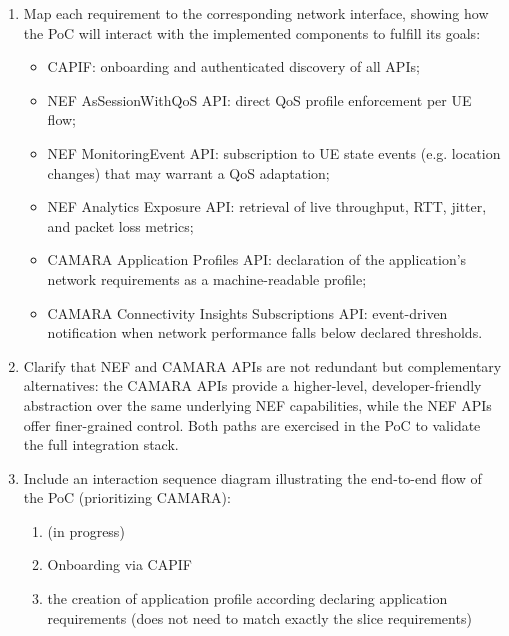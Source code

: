 {\begin{enumerate}
\begin{itemize}
            \item Dynamic \acs{QoS} adaptation enforced through CAMARA \acs{QoS} \acs{API} in response to either geographical changes obtained with CAMARA Device Location \acs{API} in digital twin / \acs{CAM} scenarios, or to network quality deterioration (or to video quality deterioration in case of video streaming/broadcast).
            \item \acs{PPDR}: \acs{IOPS}, \acs{FIDEGAD}
        \end{itemize}
        \item Map each requirement to the corresponding network interface, showing how the PoC will interact with the implemented components to fulfill its goals:
        \begin{itemize}
            \item CAPIF: onboarding and authenticated discovery of all APIs;
            \item NEF AsSessionWithQoS API: direct QoS profile enforcement per UE flow;
            \item NEF MonitoringEvent API: subscription to UE state events (e.g. location changes) that may warrant a QoS adaptation;
            \item NEF Analytics Exposure API: retrieval of live throughput, RTT, jitter, and packet loss metrics;
            \item CAMARA Application Profiles API: declaration of the application's network requirements as a machine-readable profile;
            \item CAMARA Connectivity Insights Subscriptions API: event-driven notification when network performance falls below declared thresholds.
        \end{itemize}
        \item Clarify that NEF and CAMARA APIs are not redundant but complementary alternatives: the CAMARA APIs provide a higher-level, developer-friendly abstraction over the same underlying NEF capabilities, while the NEF APIs offer finer-grained control. Both paths are exercised in the PoC to validate the full integration stack.
        \item Include an interaction sequence diagram illustrating the end-to-end flow of the PoC (prioritizing CAMARA):
        \begin{enumerate}
            \item (in progress)
            \item Onboarding via CAPIF
            \item the creation of application profile according declaring application requirements (does not need to match exactly the slice requirements)

\end{enumerate}
\end{enumerate}}

